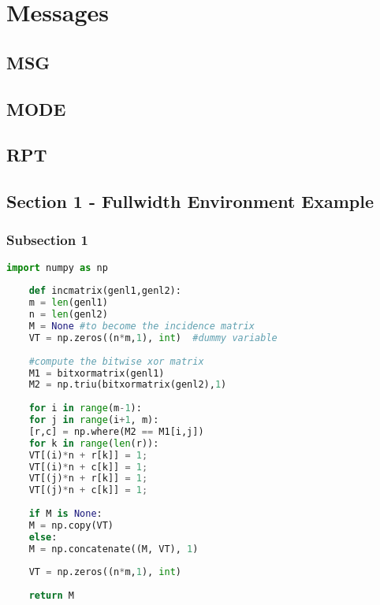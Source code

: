 \documentclass{tufte-book} %
\begin{document}

\chapter{Messages}
\label{ch:1}


\section{MSG}


\section{MODE}


\section{RPT}



\section{Section 1 - Fullwidth Environment Example}

\begin{fullwidth}
\lipsum[5]
\end{fullwidth}

\subsection{Subsection 1}




\begin{lstlisting}[language=Python, caption=Python example]
	import numpy as np
	
	def incmatrix(genl1,genl2):
	m = len(genl1)
	n = len(genl2)
	M = None #to become the incidence matrix
	VT = np.zeros((n*m,1), int)  #dummy variable
	
	#compute the bitwise xor matrix
	M1 = bitxormatrix(genl1)
	M2 = np.triu(bitxormatrix(genl2),1) 
	
	for i in range(m-1):
	for j in range(i+1, m):
	[r,c] = np.where(M2 == M1[i,j])
	for k in range(len(r)):
	VT[(i)*n + r[k]] = 1;
	VT[(i)*n + c[k]] = 1;
	VT[(j)*n + r[k]] = 1;
	VT[(j)*n + c[k]] = 1;
	
	if M is None:
	M = np.copy(VT)
	else:
	M = np.concatenate((M, VT), 1)
	
	VT = np.zeros((n*m,1), int)
	
	return M
\end{lstlisting}
\end{document}

